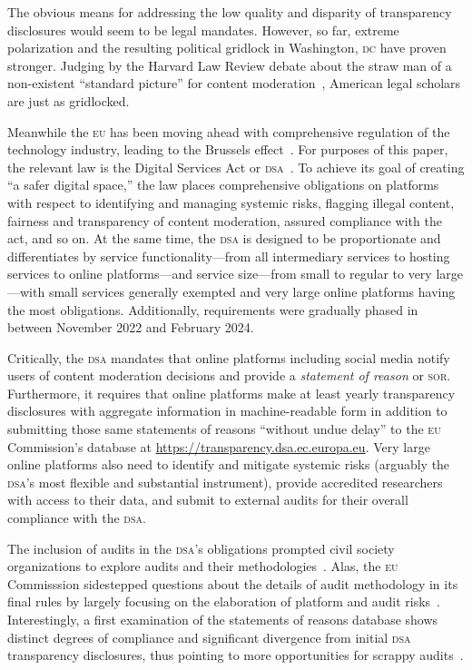\documentclass[nonacm,screen]{acmart}
\newcommand\V[1]{\textsc{\MakeLowercase{#1}}}
\begin{document}
\begin{itemize}
{The obvious means for addressing the low quality and disparity of transparency
disclosures would seem to be legal mandates. However, so far, extreme
polarization and the resulting political gridlock in Washington, \V{DC} have
proven stronger. Judging by the Harvard Law Review debate about the straw man of
a non-existent ``standard picture'' for content
moderation~\cite{Douek2022,Kadri2022,Klonick2023,MinowMinow2023}, American legal
scholars are just as gridlocked.

Meanwhile the \V{EU} has been moving ahead with comprehensive regulation of the
technology industry, leading to the Brussels effect~\cite{Bradford2020}. For
purposes of this paper, the relevant law is the Digital Services Act or
\V{DSA}~\cite{EuropeanParliamentAndCouncil2022}. To achieve its goal of creating
``a safer digital space,'' the law places comprehensive obligations on platforms
with respect to identifying and managing systemic risks, flagging illegal
content, fairness and transparency of content moderation, assured compliance
with the act, and so on. At the same time, the \V{DSA} is designed to be
proportionate and differentiates by service functionality---from all
intermediary services to hosting services to online platforms---and service
size---from small to regular to very large---with small services generally
exempted and very large online platforms having the most obligations.
Additionally, requirements were gradually phased in between November 2022 and
February 2024.

Critically, the \V{DSA} mandates that online platforms including social media
notify users of content moderation decisions and provide a \emph{statement of
reason} or \V{SoR}. Furthermore, it requires that online platforms make at least
yearly transparency disclosures with aggregate information in machine-readable
form in addition to submitting those same statements of reasons ``without undue
delay'' to the \V{EU} Commission's database at
\url{https://transparency.dsa.ec.europa.eu}. Very large online platforms also
need to identify and mitigate systemic risks (arguably the \V{DSA}'s most
flexible and substantial instrument), provide accredited researchers with access
to their data, and submit to external audits for their overall compliance with
the \V{DSA}.

The inclusion of audits in the \V{DSA}'s obligations prompted civil society
organizations to explore audits and their
methodologies~\cite{ActionCoalitionOnMeaningfulTransparency2023,AdaLovelaceInstitute2021,
BhatiaAllen2023,CostanzaChockRajiea2022,MessmerDegeling2023}. Alas, the \V{EU}
Commisssion sidestepped questions about the details of audit methodology in its
final rules by largely focusing on the elaboration of platform and audit
risks~\cite{EuropeanCommission2023}. Interestingly, a first examination of the
statements of reasons database shows distinct degrees of compliance and
significant divergence from initial \V{DSA} transparency disclosures, thus
pointing to more opportunities for scrappy audits~\cite{TrujilloFagniea2024}.

}
\end{itemize}
\end{document}
